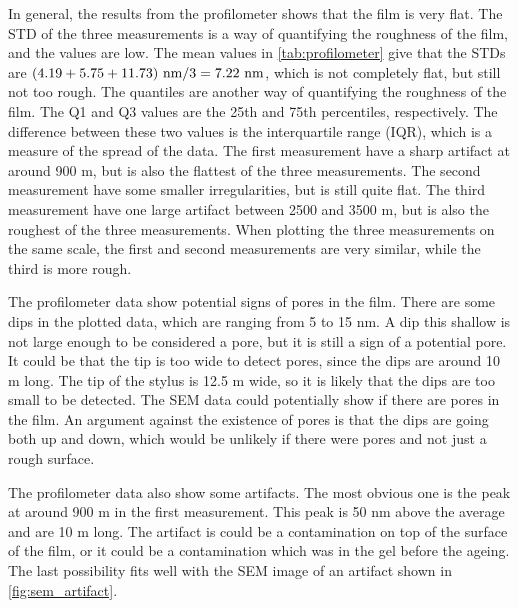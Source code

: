 \noindent In general, the results from the profilometer shows that the film is very flat.
The STD of the three measurements is a way of quantifying the roughness of the film, and the values are low.
The mean values in \autoref{tab:profilometer} give that the STDs are $(4.19 + 5.75 + 11.73) \textnormal{ nm} / 3  = 7.22 \textnormal{ nm}$, which is not completely flat, but still not too rough. %
The quantiles are another way of quantifying the roughness of the film.
The Q1 and Q3 values are the 25th and 75th percentiles, respectively.
The difference between these two values is the interquartile range (IQR), which is a measure of the spread of the data.
The first measurement have a sharp artifact at around 900 \textmu m, but is also the flattest of the three measurements.
The second measurement have some smaller irregularities, but is still quite flat.
The third measurement have one large artifact between 2500 and 3500 \textmu m, but is also the roughest of the three measurements.
When plotting the three measurements on the same scale, the first and second measurements are very similar, while the third is more rough.

The profilometer data show potential signs of pores in the film.
There are some dips in the plotted data, which are ranging from 5 to 15 nm.
A dip this shallow is not large enough to be considered a pore, but it is still a sign of a potential pore.
It could be that the tip is too wide to detect pores, since the dips are around 10 \textmu m long.
The tip of the stylus is 12.5 \textmu m wide, so it is likely that the dips are too small to be detected.
The SEM data could potentially show if there are pores in the film.
An argument against the existence of pores is that the dips are going both up and down, which would be unlikely if there were pores and not just a rough surface. %

The profilometer data also show some artifacts.
The most obvious one is the peak at around 900 \textmu m in the first measurement.
This peak is 50 nm above the average and are 10 \textmu m long.
The artifact is could be a contamination on top of the surface of the film, or it could be a contamination which was in the gel before the ageing.
The last possibility fits well with the SEM image of an artifact shown in \autoref{fig:sem_artifact}.

